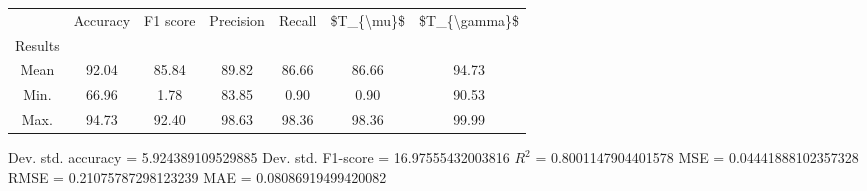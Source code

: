 \begin{tabular}{|c|c|c|c|c|c|c|}
\toprule
{} &  Accuracy &  F1 score &  Precision &  Recall &  \$T\_\{\textbackslash mu\}\$ &  \$T\_\{\textbackslash gamma\}\$ \\
Results &           &           &            &         &            &               \\
\hline
Mean    &     92.04 &     85.84 &      89.82 &   86.66 &      86.66 &         94.73 \\
Min.    &     66.96 &      1.78 &      83.85 &    0.90 &       0.90 &         90.53 \\
Max.    &     94.73 &     92.40 &      98.63 &   98.36 &      98.36 &         99.99 \\
\bottomrule
\end{tabular}

 Dev. std. accuracy = 5.924389109529885
 Dev. std. F1-score = 16.97555432003816
 $R^2$ = 0.8001147904401578
 MSE = 0.04441888102357328
 RMSE = 0.21075787298123239
 MAE = 0.08086919499420082